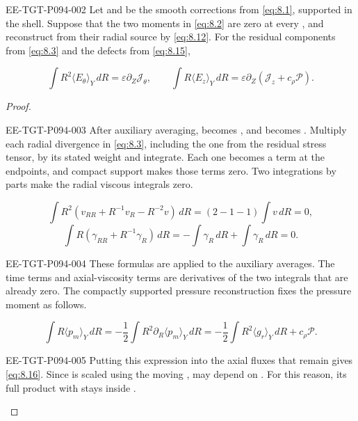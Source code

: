 \begin{proposition}\label{prop:8.4}
\begin{EESegment}{EE-TGT-P094-002}
Let  and  be the smooth corrections
from \eqref{eq:8.1}, supported in the shell. Suppose that the two moments in \eqref{eq:8.2} are zero
at every , and reconstruct  from their radial
source  by \eqref{eq:8.12}. For the residual components
 from \eqref{eq:8.3} and the defects
 from \eqref{eq:8.15},
\end{EESegment}
\begin{equation}
\int R^2\langle E_\theta\rangle_Y\,dR
=\varepsilon\partial_Z\mathcal J_\theta,
\qquad
\int R\langle E_z\rangle_Y\,dR
=\varepsilon\partial_Z(\mathcal J_z+c_\rho\mathcal P).
\tag{8.16}\label{eq:8.16}
\end{equation}
\end{proposition}

\begin{proof}
\begin{EESegment}{EE-TGT-P094-003}
After auxiliary averaging,  becomes
, and  becomes
. Multiply each radial divergence in
\eqref{eq:8.3}, including the one from the residual stress tensor, by its stated weight and integrate.
Each one becomes a term at the endpoints, and compact support makes those terms zero. Two
integrations by parts make the radial viscous integrals zero.
\end{EESegment}
\[
\int R^2(v_{RR}+R^{-1}v_R-R^{-2}v)\,dR
=(2-1-1)\int v\,dR=0,
\]
\[
\int R(\gamma_{RR}+R^{-1}\gamma_R)\,dR
=-\int\gamma_R\,dR+\int\gamma_R\,dR=0.
\]
\begin{EESegment}{EE-TGT-P094-004}
These formulas are applied to the auxiliary averages. The time terms and axial-viscosity terms are
derivatives of the two integrals that are already zero. The compactly supported pressure
reconstruction fixes the pressure moment as follows.
\end{EESegment}
\[
\int R\langle p_m\rangle_Y\,dR
=-\frac12\int R^2\partial_R\langle p_m\rangle_Y\,dR
=-\frac12\int R^2\langle g_r\rangle_Y\,dR+c_\rho\mathcal P.
\]
\begin{EESegment}{EE-TGT-P094-005}
Putting this expression into the axial fluxes that remain gives \eqref{eq:8.16}. Since
 is scaled using the moving ,
 may depend on . For this reason, its full
product with  stays inside
.
\end{EESegment}
\end{proof}

